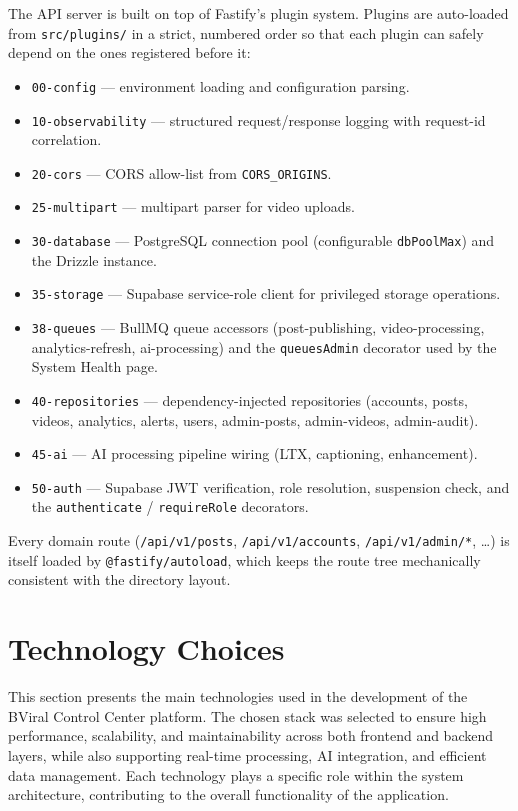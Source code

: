 The API server is built on top of Fastify's plugin system. Plugins are auto-loaded from \texttt{src/plugins/} in a strict, numbered order so that each plugin can safely depend on the ones registered before it:

\begin{itemize}
    \item \texttt{00-config} --- environment loading and configuration parsing.
    \item \texttt{10-observability} --- structured request/response logging with request-id correlation.
    \item \texttt{20-cors} --- CORS allow-list from \texttt{CORS\_ORIGINS}.
    \item \texttt{25-multipart} --- multipart parser for video uploads.
    \item \texttt{30-database} --- PostgreSQL connection pool (configurable \texttt{dbPoolMax}) and the Drizzle instance.
    \item \texttt{35-storage} --- Supabase service-role client for privileged storage operations.
    \item \texttt{38-queues} --- BullMQ queue accessors (post-publishing, video-processing, analytics-refresh, ai-processing) and the \texttt{queuesAdmin} decorator used by the System Health page.
    \item \texttt{40-repositories} --- dependency-injected repositories (accounts, posts, videos, analytics, alerts, users, admin-posts, admin-videos, admin-audit).
    \item \texttt{45-ai} --- AI processing pipeline wiring (LTX, captioning, enhancement).
    \item \texttt{50-auth} --- Supabase JWT verification, role resolution, suspension check, and the \texttt{authenticate} / \texttt{requireRole} decorators.
\end{itemize}

Every domain route (\texttt{/api/v1/posts}, \texttt{/api/v1/accounts}, \texttt{/api/v1/admin/*}, \ldots) is itself loaded by \texttt{@fastify/autoload}, which keeps the route tree mechanically consistent with the directory layout.

\section{Technology Choices}
This section presents the main technologies used in the development of the BViral Control Center platform. The chosen stack was selected to ensure high performance, scalability, and maintainability across both frontend and backend layers, while also supporting real-time processing, AI integration, and efficient data management. Each technology plays a specific role within the system architecture, contributing to the overall functionality of the application.
